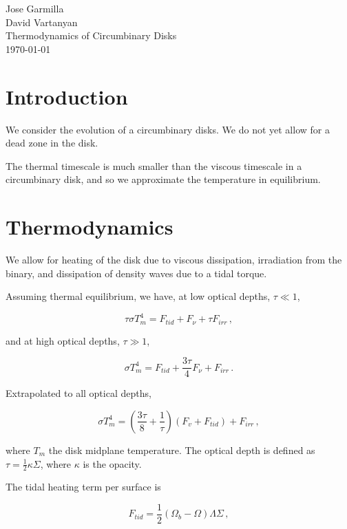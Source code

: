 \documentclass{article}
\begin{document}
\begin{flushleft}
Jose Garmilla \\
David Vartanyan\\
Thermodynamics of Circumbinary Disks\\
\today\\
\end{flushleft}
\section{Introduction}
We consider the evolution of a circumbinary disks. We do not yet allow for a dead zone in the disk.

The thermal timescale is much smaller than the viscous timescale in a circumbinary disk, and so we approximate the temperature in equilibrium.

\section{Thermodynamics}
We allow for heating of the disk due to viscous dissipation, irradiation from the binary, and dissipation of density waves due to a tidal torque.

Assuming thermal equilibrium, we have, at low optical depths, $\tau \ll 1$,

\begin{equation}
\tau \sigma T_m^4 = F_{tid} + F_{\nu} + \tau F_{irr}\,,
\end{equation}

and at high optical depths, $\tau \gg 1$,

\begin{equation}
\sigma T_m^4 = F_{tid} + \frac{3\tau}{4}  F_\nu + F_{irr}\,.
\end{equation}

Extrapolated to all optical depths,

\begin{equation} \label{eq:encon}
\sigma T_m^4= \left(\frac{3\tau}{8} + \frac{1}{\tau}\right) \left(F_{v} + F_{tid}\right) + F_{irr}\,,
\end{equation}

where $T_m$ the disk midplane temperature. The optical depth is defined as $\tau =\frac{1}{2} \kappa \Sigma$, where $\kappa$ is the opacity.

The tidal heating term per surface is

\begin{equation}
F_{tid} = \frac{1}{2}\left(\Omega_b - \Omega\right) \Lambda \Sigma\,,
\end{equation}
\end{document}
